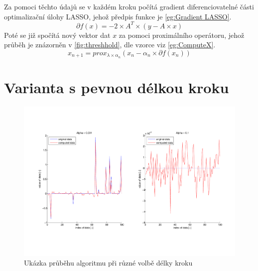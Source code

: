 \documentclass[FM,BP]{tulthesis}
\newcounter{Vzorce}
\begin{document}
Za pomoci těchto údajů se v každém kroku počítá gradient diferenciovatelné části optimalizační úlohy LASSO, jehož předpis funkce je \ref{eg:Gradient LASSO}.
\begin{equation} \label{eg:Gradient LASSO}  \tag{Vzorec \theVzorce}
\partial f(x) = -2 \times A^T \times (y-A \times x)
\end{equation}
Poté se již spočítá nový vektor dat $x$ za pomoci proximálního operátoru, jehož průběh je znázorněn v \ref{fig:threshhold}, dle vzorce viz \ref{eg:ComputeX}. 
\begin{equation} \label{eg:ComputeX}  \tag{Vzorec \theVzorce}
x_{n+1} = prox_{\lambda \times \alpha _{n}}(x_{n}- \alpha _{n} \times \partial f(x_{n}))
\end{equation}

\section{Varianta s pevnou délkou kroku}

\begin{figure}[!h]
\begin{center}
\includegraphics[scale=0.5]{obr/basic.pdf}
\end{center}
\caption{Ukázka průběhu algoritmu při různé volbě délky kroku}
\label{fig:basicAlpha}
\end{figure} 
\end{document}
